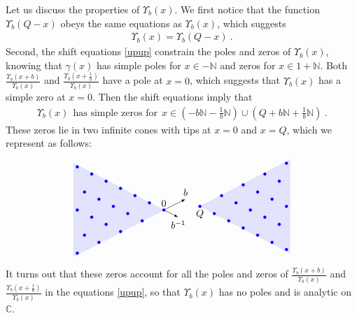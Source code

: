 \documentclass[12pt, a4paper, notitlepage, twoside]{report}
\numberwithin{equation}{section}
\theoremstyle{break}
\begin{document}
Let us discuss the properties of $\Upsilon_b(x)$. 
We first notice that the function $\Upsilon_b(Q-x)$ obeys the same equations as $\Upsilon_b(x)$, which suggests 
\begin{align}
 \boxed{\Upsilon_b(x) = \Upsilon_b(Q-x)}\ .
\label{upq}
\end{align}
Second, the shift equations \eqref{upup} constrain the poles and zeros of  $\Upsilon_b(x)$, knowing that $\gamma(x)$ has simple poles for $x\in -{\mathbb{N}}$ and zeros for $x\in 1+{\mathbb{N}}$.
Both $\frac{\Upsilon_b(x+b)}{\Upsilon_b(x)}$ and $\frac{\Upsilon_b(x+\frac{1}{b})}{\Upsilon_b(x)}$ have a pole at $x=0$, which suggests that $\Upsilon_b(x)$ has a simple zero at $x=0$.
Then the shift equations imply that 
\begin{align}
 \boxed{\Upsilon_b(x)\ \ \text{has simple zeros for}\ \ x\in  \left(-b{\mathbb{N}} -\tfrac{1}{b}{\mathbb{N}} \right) \cup \left( Q+b{\mathbb{N}} + \tfrac{1}{b}{\mathbb{N}}\right)} \ .
\label{xbn}
\end{align}
These zeros lie in two infinite cones with tips at $x=0$ and $x=Q$, which we represent as follows:
\begin{align}
\begin{tikzpicture}[scale = 1.3, baseline=(current  bounding  box.center)]
\node[above] at (0, 0) {$0$};
\node[below] at (1, .1) {$Q$};
\draw [latex-latex] (.6, .3) node[above] {$b$} -- (0, 0) -- (.4, -.2) node[below] {$b^{-1}$};
\begin{scope}[rotate = 90]
\filldraw[blue, opacity = .1] (0,0) -- (-1.3, 2.5) -- (1.3, 2.5) -- cycle;
\clip (-1.4, -.2) -- (1.4, -.2) -- (1.4, 2.5) -- (-1.4, 2.5) -- cycle;
\foreach \x in {0, 1,...,4}{
  \foreach \y in {0, 1,...,6}{
    \node[draw,circle,inner sep=1pt,fill,blue] at (-.3*\x +.2*\y, .6*\x +.4*\y) {};
  }}
  \end{scope}
\begin{scope}[shift = {(1, .1)}, rotate = -90]
\filldraw[blue, opacity = .1] (0,0) -- (-1.3, 2.5) -- (1.3, 2.5) -- cycle;
\clip (-1.4, -.2) -- (1.4, -.2) -- (1.4, 2.5) -- (-1.4, 2.5) -- cycle;
\foreach \x in {0, 1,...,4}{
  \foreach \y in {0, 1,...,6}{
    \node[draw,circle,inner sep=1pt,fill,blue] at (-.3*\x +.2*\y, .6*\x +.4*\y) {};
  }}  
\end{scope}  
 \end{tikzpicture}
\label{lines}
\end{align}
It turns out that these zeros account for all the poles and zeros of $\frac{\Upsilon_b(x+b)}{\Upsilon_b(x)}$ and $\frac{\Upsilon_b(x+\frac{1}{b})}{\Upsilon_b(x)}$ in the equations \eqref{upup}, so that $\Upsilon_b(x)$ has no poles and is analytic on ${\mathbb{C}}$. 
\end{document}

